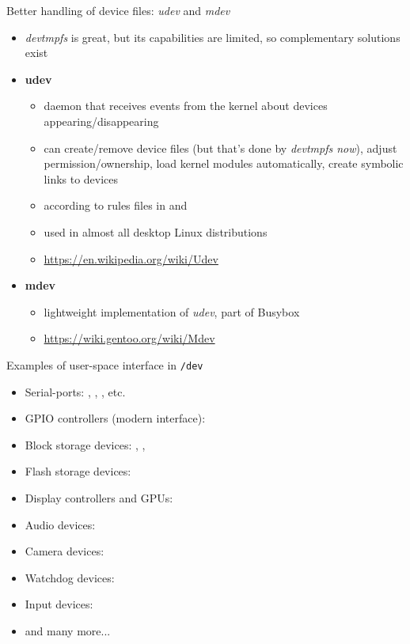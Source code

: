 \begin{frame}{Better handling of device files: {\em udev} and {\em mdev}}
  \begin{itemize}
  \item {\em devtmpfs} is great, but its capabilities are limited, so
    complementary solutions exist
  \item {\bf udev}
    \begin{itemize}
    \item daemon that receives events from the kernel about devices
      appearing/disappearing
    \item can create/remove device files (but that's done by
      {\em devtmpfs now}), adjust permission/ownership,
      load kernel modules automatically, create symbolic links to
      devices
    \item according to rules files in  and
    \item used in almost all desktop Linux distributions
    \item \url{https://en.wikipedia.org/wiki/Udev}
    \end{itemize}
  \item {\bf mdev}
    \begin{itemize}
    \item lightweight implementation of {\em udev}, part of Busybox
    \item \url{https://wiki.gentoo.org/wiki/Mdev}
    \end{itemize}
  \end{itemize}
\end{frame}

\begin{frame}{Examples of user-space interface in {\tt /dev}}
  \begin{itemize}
  \item Serial-ports: , ,
    , etc.
  \item GPIO controllers (modern interface): 
  \item Block storage devices: , , 
  \item Flash storage devices: 
  \item Display controllers and GPUs: 
  \item Audio devices: 
  \item Camera devices: 
  \item Watchdog devices: 
  \item Input devices: 
  \item and many more...
  \end{itemize}
\end{frame}

